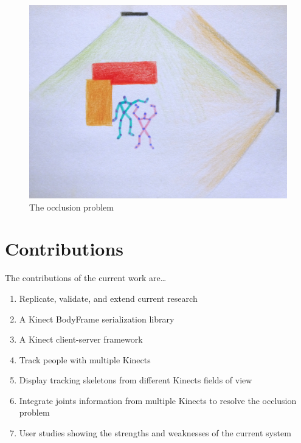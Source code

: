 \begin{figure}[!h]
  \centering
  \includegraphics[width=0.8\linewidth]{figs/occlusion_problem}
  \caption{The occlusion problem}
  \label{fig:occlusion_problem}
\end{figure}

\section{Contributions}
\label{sec:contributions}

The contributions of the current work are\ldots

\begin{enumerate}
  \item Replicate, validate, and extend current research
  \item A Kinect BodyFrame serialization library
  \item A Kinect client-server framework
  \item Track people with multiple Kinects
  \item Display tracking skeletons from different Kinects fields of view
  \item Integrate joints information from multiple Kinects to resolve the occlusion problem
  \item User studies showing the strengths and weaknesses of the current system
\end{enumerate}



